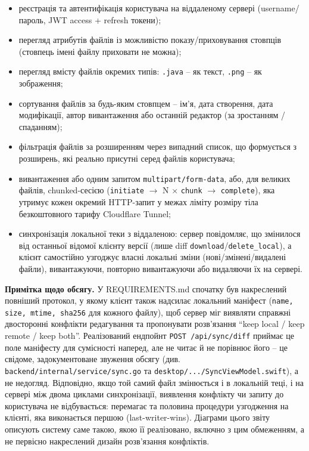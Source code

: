 \documentclass[12pt,a4paper]{article}
\begin{document}
\begin{itemize}[nosep]
    \item реєстрація та автентифікація користувача на віддаленому сервері (username/пароль, JWT access + refresh токени);
    \item перегляд атрибутів файлів із можливістю показу/приховування стовпців (стовпець імені файлу приховати не можна);
    \item перегляд вмісту файлів окремих типів: \texttt{.java} -- як текст, \texttt{.png} -- як зображення;
    \item сортування файлів за будь-яким стовпцем -- ім'я, дата створення, дата модифікації, автор вивантаження або останній редактор (за зростанням / спаданням);
    \item фільтрація файлів за розширенням через випадний список, що формується з розширень, які реально присутні серед файлів користувача;
    \item вивантаження або одним запитом \texttt{multipart/form-data}, або, для великих файлів, chunked-сесією (\texttt{initiate} $\to$ N $\times$ \texttt{chunk} $\to$ \texttt{complete}), яка утримує кожен окремий HTTP-запит у межах ліміту розміру тіла безкоштовного тарифу Cloudflare Tunnel;
    \item синхронізація локальної теки з віддаленою: сервер повідомляє, що змінилося від останньої відомої клієнту версії (лише diff \texttt{download}/\texttt{delete\_local}), а клієнт самостійно узгоджує власні локальні зміни (нові/змінені/видалені файли), вивантажуючи, повторно вивантажуючи або видаляючи їх на сервері.
\end{itemize}

\textbf{Примітка щодо обсягу.} У REQUIREMENTS.md спочатку був накреслений повніший протокол, у якому клієнт також надсилає локальний маніфест (\texttt{name, size, mtime, sha256} для кожного файлу), щоб сервер міг виявляти справжні двосторонні конфлікти редагування та пропонувати розв'язання ``keep local / keep remote / keep both''. Реалізований ендпойнт \texttt{POST /api/sync/diff} приймає це поле маніфесту для сумісності наперед, але не читає й не порівнює його -- це свідоме, задокументоване звуження обсягу (див. \texttt{backend/internal/service/sync.go} та \texttt{desktop/.../SyncViewModel.swift}), а не недогляд. Відповідно, якщо той самий файл змінюється і в локальній теці, і на сервері між двома циклами синхронізації, виявлення конфлікту чи запиту до користувача не відбувається: перемагає та половина процедури узгодження на клієнті, яка виконається першою (last-writer-wins). Діаграми цього звіту описують систему саме такою, якою її реалізовано, включно з цим обмеженням, а не первісно накреслений дизайн розв'язання конфліктів.
\end{document}
